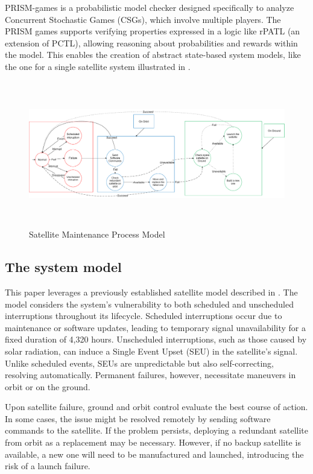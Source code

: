 PRISM-games is a probabilistic model checker designed specifically to analyze Concurrent Stochastic Games (CSGs), which involve multiple players. The PRISM games supports verifying properties expressed in a logic like rPATL (an extension of PCTL), allowing reasoning about probabilities and rewards within the model.  This enables the creation of abstract state-based system models, like the one for a single satellite system illustrated in .


\begin{figure}[htbp]
    \centering
    		\includegraphics[width=500pt, height =180pt]{Dessin1.pdf}
    \caption{Satellite Maintenance Process Model \cite{Hoque2015,Yu2015}}
    \label{fig:usecase}
\end{figure} 

\subsection{The system model}
This paper leverages a previously established satellite model described in \cite{Hoque2015,Yu2015,Zhaoguang2013}. The model considers the system's vulnerability to both scheduled and unscheduled interruptions throughout its lifecycle. Scheduled interruptions occur due to maintenance or software updates, leading to temporary signal unavailability for a fixed duration of 4,320 hours. Unscheduled interruptions, such as those caused by solar radiation, can induce a Single Event Upset (SEU) in the satellite's signal. Unlike scheduled events, SEUs are unpredictable but also self-correcting, resolving automatically. Permanent failures, however, necessitate maneuvers in orbit or on the ground.


Upon satellite failure, ground and orbit control evaluate the best course of action. In some cases, the issue might be resolved remotely by sending software commands to the satellite. If the problem persists, deploying a redundant satellite from orbit as a replacement may be necessary. However, if no backup satellite is available, a new one will need to be manufactured and launched, introducing the risk of a launch failure.

